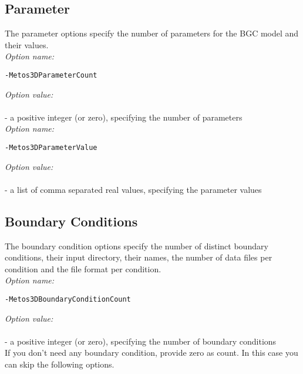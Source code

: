 \documentclass{article}
\begin{document}
%
%
\subsection{Parameter}

The parameter options specify the number of parameters for the BGC model
and their values. \\

\emph{Option name:}
\begin{verbatim}
-Metos3DParameterCount
\end{verbatim}

\emph{Option value:} \\
\vspace{-0.3cm}\\
- a positive integer (or zero), specifying the number of parameters \\

\emph{Option name:}
\begin{verbatim}
-Metos3DParameterValue
\end{verbatim}

\emph{Option value:} \\
\vspace{-0.3cm}\\
- a list of comma separated real values, specifying the parameter values \\

%
%
\subsection{Boundary Conditions}

The boundary condition options specify the number of distinct boundary conditions,
their input directory, their names, the number of data files per condition
and the file format per condition. \\

\emph{Option name:}
\begin{verbatim}
-Metos3DBoundaryConditionCount
\end{verbatim}

\emph{Option value:} \\
\vspace{-0.3cm}\\
- a positive integer (or zero), specifying the number of boundary conditions \\

If you don't need any boundary condition, provide zero as count.
In this case you can skip the following options. \\
\end{document}
